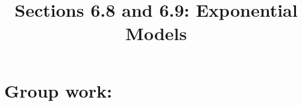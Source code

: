 \documentclass[noinstructornotes]{ximera}
\title{Sections 6.8 and 6.9: Exponential Models}
\begin{document}
\begin{abstract}		\end{abstract}
\maketitle



\begin{comment}
\section{Warm up:}

	\begin{freeResponse}
	
	\end{freeResponse}
	
\begin{instructorNotes}

\end{instructorNotes}
\end{comment}







\section{Group work:}
\end{document}
